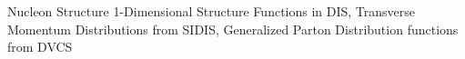 

\begin{cvskills}

  \cvskill
    {Nucleon Structure} %
    {1-Dimensional Structure Functions in DIS, Transverse Momentum Distributions from SIDIS,
    Generalized Parton Distribution functions from DVCS} %

\end{cvskills}
